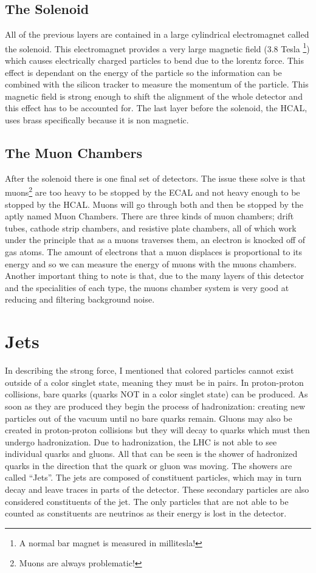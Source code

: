 \subsection{The Solenoid}

All of the previous layers are contained in a large cylindrical electromagnet called the solenoid.
This electromagnet provides a very large magnetic field (3.8 Tesla \footnote{A normal bar magnet is measured in millitesla!}) which causes electrically charged particles to bend due to the lorentz force.
This effect is dependant on the energy of the particle so the information can be combined with the silicon tracker to measure the momentum of the particle.
This magnetic field is strong enough to shift the alignment of the whole detector and this effect has to be accounted for.
The last layer before the solenoid, the HCAL, uses brass specifically because it is non magnetic. 

\subsection{The Muon Chambers}

After the solenoid there is one final set of detectors. The issue these solve is that muons\footnote{Muons are always problematic!} are too heavy to be stopped by the ECAL and not heavy enough to be stopped by the HCAL.
Muons will go through both and then be stopped by the aptly named Muon Chambers. There are three kinds of muon chambers; drift tubes, cathode strip chambers, and resistive plate chambers, all of which work under the principle that as a muons traverses them, an electron is knocked off of gas atoms.
The amount of electrons that a muon displaces is proportional to its energy and so we can measure the energy of muons with the muons chambers.
Another important thing to note is that, due to the many layers of this detector and the specialities of each type, the muons chamber system is very good at reducing and filtering background noise.


\section{Jets}

In describing the strong force, I mentioned that colored particles cannot exist outside of a color singlet state, meaning they must be in pairs.
In proton-proton collisions, bare quarks (quarks NOT in a color singlet state) can be produced. As soon as they are produced they begin the process of hadronization: creating new particles out of the vacuum until no bare quarks remain.
Gluons may also be created in proton-proton collisions but they will decay to quarks which must then undergo hadronization.
Due to hadronization, the LHC is not able to see individual quarks and gluons. All that can be seen is the shower of hadronized quarks in the direction that the quark or gluon was moving.
The showers are called ``Jets''. The jets are composed of constituent particles, which may in turn decay and leave traces in parts of the detector. These secondary particles are also considered constituents of the jet.
The only particles that are not able to be counted as constituents are neutrinos as their energy is lost in the detector. 


